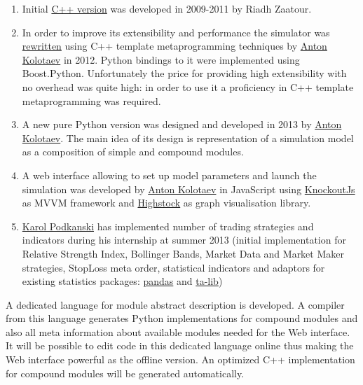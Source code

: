 \documentclass[a4paper,11pt]{article}
\begin{document}
\begin{enumerate}
\def\labelenumi{\arabic{enumi}.}
\itemsep1pt\parskip0pt
\item
  Initial
  \href{http://sourceforge.net/p/marketsimulator/svn/HEAD/tree/Simulator/}{C++
  version} was developed in 2009-2011 by Riadh Zaatour.
\item
  In order to improve its extensibility and performance the simulator
  was \href{https://github.com/antonkolotaev/v2}{rewritten} using C++
  template metaprogramming techniques by
  \href{https://github.com/antonkolotaev}{Anton Kolotaev} in 2012.
  Python bindings to it were implemented using Boost.Python.
  Unfortunately the price for providing high extensibility with no
  overhead was quite high: in order to use it a proficiency in C++
  template metaprogramming was required.
\item
  A new pure Python version was designed and developed in 2013 by
  \href{https://github.com/antonkolotaev}{Anton Kolotaev}. The main idea
  of its design is representation of a simulation model as a composition
  of simple and compound modules. 
\item
  A web interface allowing to set up model parameters and launch the
  simulation was developed by
  \href{https://github.com/antonkolotaev}{Anton Kolotaev} in JavaScript
  using \href{http://knockoutjs.com/}{KnockoutJs} as MVVM framework and
  \href{http://www.highcharts.com/products/highstock}{Highstock} as
  graph visualisation library.
\item
  \href{https://github.com/koalainparis}{Karol Podkanski} has
  implemented number of trading strategies and indicators during his
  internship at summer 2013 (initial implementation for Relative
  Strength Index, Bollinger Bands, Market Data and Market Maker
  strategies, StopLoss meta order, statistical indicators and adaptors
  for existing statistics packages:
  \href{http://pandas.pydata.org/}{pandas} and
  \href{http://ta-lib.org/}{ta-lib})
\end{enumerate}

A dedicated language for module abstract description is developed.
A compiler from this language generates Python implementations for
compound modules and also all meta information about available modules
needed for the Web interface. It will be possible to edit code in this
dedicated language online thus making the Web interface powerful as the
offline version. An optimized C++ implementation for compound modules
will be generated automatically.
\end{document}
